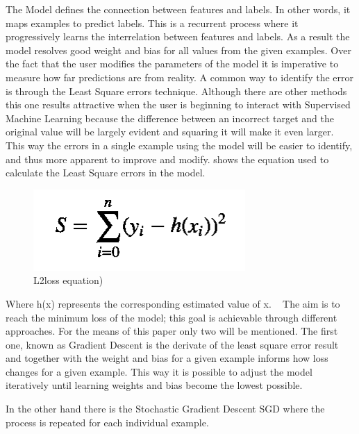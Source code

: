 The Model defines the connection between features and labels. In other words, it maps examples to predict labels. This is a recurrent process where it progressively learns the interrelation between features and labels. As a result the model resolves good weight and bias for all values from the given examples.  Over the fact that the user modifies the parameters of the model it is imperative to measure how far predictions are from reality.  A common way to identify the error is through the Least Square errors technique. Although there are other methods this one results attractive when the user is beginning to interact with Supervised Machine Learning because the difference between an incorrect target and the original value will be largely evident and squaring it will make it even larger. This way the errors in a single example using the model will be easier to identify, and thus more apparent to improve and modify. shows the equation used to calculate the Least Square errors in the model.


\begin{figure}[htbp]
  \centering
  \includegraphics[width=\textwidth]{images/equation1}
  \caption{L2loss equation)}
  \label{fig:L2loss equation}
\end{figure}


Where h(x) represents the corresponding estimated value of x. ~\cite{rish15} 
The aim is to reach the minimum loss of the model; this goal is achievable through different approaches. For the means of this paper only two will be mentioned. The first one, known as Gradient Descent is the derivate of the least square error result and together with the weight and bias for a given example informs how loss changes for a given example. This way it is possible to adjust the model iteratively until learning weights and bias become the lowest possible. 

In the other hand there is the Stochastic Gradient Descent \ac{SGD} where the process is repeated for each individual example.

